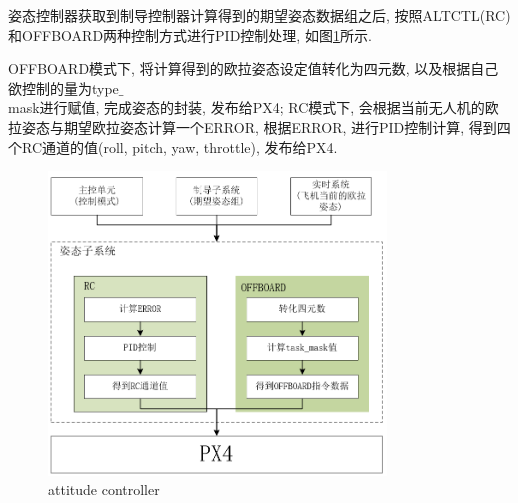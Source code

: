 姿态控制器获取到制导控制器计算得到的期望姿态数据组之后, 按照ALTCTL(RC)和OFFBOARD两种控制方式进行PID控制处理, 如图\ref{fig:atti}所示. 
\par OFFBOARD模式下, 将计算得到的欧拉姿态设定值转化为四元数, 以及根据自己欲控制的量为type$\_$\\mask进行赋值, 完成姿态的封装, 发布给PX4; 
RC模式下, 会根据当前无人机的欧拉姿态与期望欧拉姿态计算一个ERROR, 根据ERROR, 进行PID控制计算, 得到四个RC通道的值(roll, pitch, yaw, throttle), 发布给PX4. 
\begin{figure}[htbp]
    \centering
    \includegraphics[width=0.8\textwidth]{pictures/attitudeCtrl.png}
    \caption{attitude controller}
    \label{fig:atti}
\end{figure}